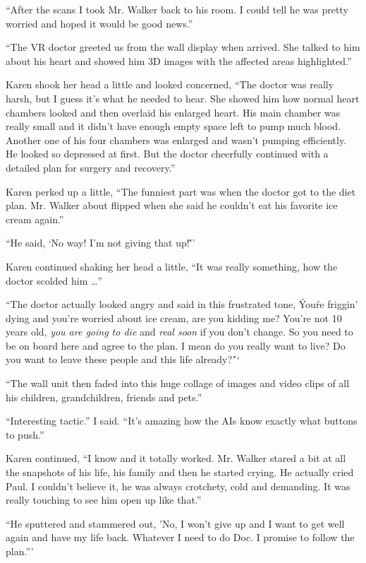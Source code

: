 ``After the scans I took Mr. Walker back to his room. I could
tell he was pretty worried and hoped it would be good news.''

``The VR doctor greeted us from the wall display when arrived.
She talked to him about his heart and showed him 3D images with
the affected areas highlighted.''

Karen shook her head a little and looked concerned, ``The
doctor was really harsh, but I guess it's what he needed to
hear. She showed him how normal heart chambers looked and then
overlaid his enlarged heart. His main chamber was
really small and it didn't have enough empty space left to pump
much blood. Another one of his four chambers was enlarged and
wasn't pumping efficiently. He looked so depressed at first. But
the doctor cheerfully continued with a detailed plan for surgery
and recovery.''

Karen perked up a little, ``The funniest part was when the
doctor got to the diet plan. Mr. Walker about flipped when she
said he couldn't eat his favorite ice cream again.''

``He said, `No way! I'm not giving that up!\'''

Karen continued shaking her head a little, ``It was really
something, how the doctor scolded him \ldots''

``The doctor actually looked angry and said in this frustrated
tone, \'You\'re friggin' dying and you're worried about ice cream,
are you kidding me? You're not 10 years old, \emph{you are going
to die} and \emph{real soon} if you don't change. So you need to
be on board here and agree to the plan. I mean do you
really want to live? Do you want to leave these people
and this life already?\'``

``The wall unit then faded into this huge collage of images and
video clips of all his children, grandchildren, friends and pets.''

``Interesting tactic.'' I said. ``It's amazing how the AIs know
exactly what buttons to push.''

Karen continued, ``I know and it totally worked. Mr. Walker
stared a bit at all the snapshots of his life, his family and
then he started crying. He actually cried Paul. I couldn't
believe it, he was always crotchety, cold and demanding.  It was
really touching to see him open up like that.''

``He sputtered and stammered out, 'No, I won't give up and I
want to get well again and have my life back. Whatever I need
to do Doc. I promise to follow the plan.'''

